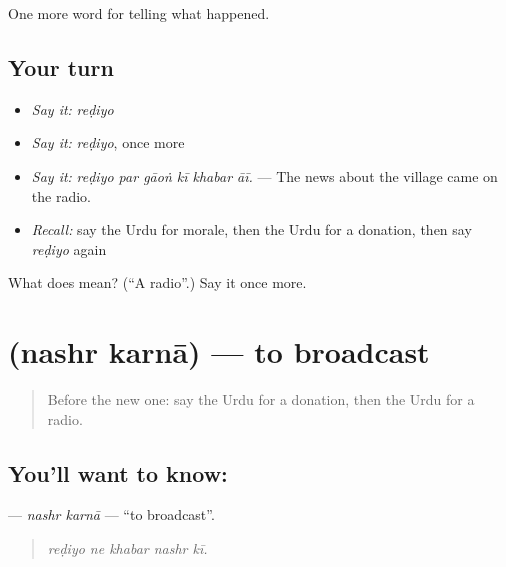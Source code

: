 \begin{grammarlens}[title={What you've built}]
One more word for telling what happened.
\end{grammarlens}

\subsection*{Your turn}
\begin{itemize}
\raggedright
  \item \emph{Say it:} \emph{reḍiyo}
  \item \emph{Say it:} \emph{reḍiyo}, once more
  \item \emph{Say it:} \emph{reḍiyo par gāoṅ kī khabar āī.} — The news about the village came on the radio.
  \item \emph{Recall:} say the Urdu for morale, then the Urdu for a donation, then say \emph{reḍiyo} again
\end{itemize}

\begin{tcolorbox}[breakable,colback=teal!4,colframe=teal!35!black,title={Before you move on}]
What does  mean? (\textquotedblleft{}A radio\textquotedblright{}.) Say it once more.
\end{tcolorbox}
\section[\texorpdfstring{\ur{نشر} \ur{کرنا} (nashr karnā)}{نشر کرنا (nashr karnā)}]{  (nashr karnā) — to broadcast}

\label{lesson:UR-C300-nashr-karna}



\begin{quote}
Before the new one: say the Urdu for a donation, then the Urdu for a radio.
\end{quote}

\subsection*{You'll want to know:  }
\textbf{ } — \emph{nashr karnā} — \textquotedblleft{}to broadcast\textquotedblright{}.

\begin{quote}
    
\end{quote}

\begin{quote}
\emph{reḍiyo ne khabar nashr kī.}
\end{quote}

